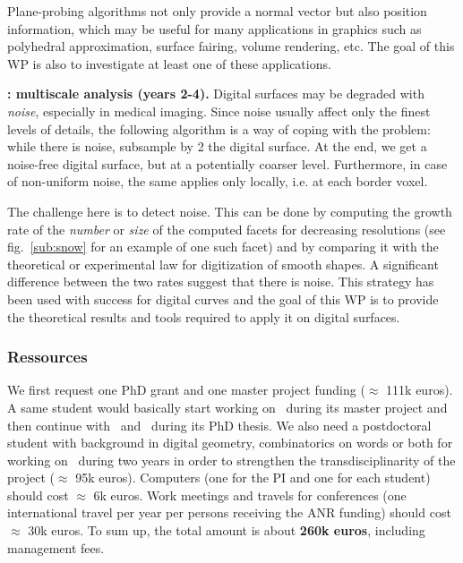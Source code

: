 Plane-probing algorithms not only provide a normal vector but also position information, which may be useful for many applications in graphics such as polyhedral approximation, surface fairing, volume rendering, etc. The goal of this WP is also to investigate at least one of these applications.   

\noindent\textbf{\wpScale: multiscale analysis (years 2-4).} Digital surfaces may be degraded with \emph{noise}, especially in medical imaging. Since noise usually affect only the finest levels of details, the following algorithm is a way of coping with the problem: while there is noise, subsample by 2 the digital surface. At the end, we get a noise-free digital surface, but at a potentially coarser level. Furthermore, in case of non-uniform noise, the same applies only locally, i.e. at each border voxel.  

The challenge here is to detect noise. This can be done by computing the growth rate of the \emph{number} or \emph{size} of the computed facets for decreasing resolutions (see fig.~\ref{sub:snow} for an example of one such facet) and by comparing it with the theoretical or experimental law for digitization of smooth shapes. A significant difference between the two rates suggest that there is noise. 
This strategy has been used with success for digital curves \cite{Kerautret2012} and the goal of this WP is to provide the theoretical results and tools required to apply it on digital surfaces. 


\subsubsection{Ressources}
\label{sec:ressources}



We first request one PhD grant and one master project funding ($\approx$ 111k euros). A same student would basically start working on \wpPPA~during its master project and then continue with \wpEstim~and \wpScale~during its PhD thesis. We also need a postdoctoral student with background in digital geometry, combinatorics on words or both for working on \wpPattern~during two years in order to strengthen the transdisciplinarity of the project ($\approx$ 95k euros). 
Computers (one for the PI and one for each student) should cost $\approx$ 6k euros. Work meetings and travels for conferences (one international travel per year per persons receiving the ANR funding) should cost $\approx$ 30k euros. 
To sum up, the total amount is about \textbf{260k euros}, including management fees. 



